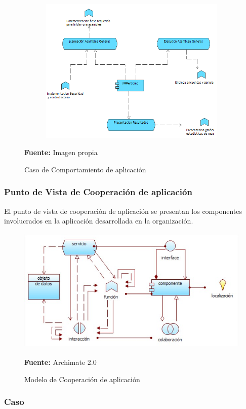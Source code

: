 \begin{figure}[th!]
	\centering
	\includegraphics[width=13cm,height=7cm]{arquitectura/aplicacion/imgs/comportamiento}
	\caption{Caso de Comportamiento de aplicación}{\scriptsize \textbf{Fuente:} Imagen propia}
\end{figure}

\subsubsection{Punto de Vista de Cooperación de aplicación}

El punto de vista de cooperación de aplicación se presentan los componentes involucrados en la aplicación desarrollada en la organización.


\begin{figure}[th!]
	\centering
	\includegraphics[width=13cm,height=6cm]{arquitectura/aplicacion/imgs/cooperacion-e}
	\caption{Modelo de Cooperación de aplicación}{\scriptsize \textbf{Fuente:} Archimate 2.0 \cite{WEB7}}
\end{figure}

\subsubsection{Caso}

